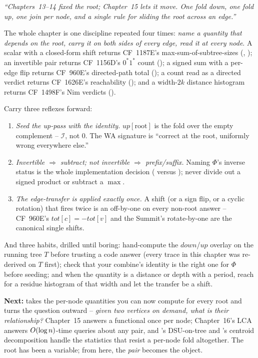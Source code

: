 \begin{lastword}
\emph{``Chapters~13--14 fixed the root; Chapter~15 lets it move. One fold down,
one fold up, one join per node, and a single rule for sliding the root across an
edge.''}

\medskip
The whole chapter is one discipline repeated four times: \emph{name a quantity that
depends on the root, carry it on both sides of every edge, read it at every node}.
A scalar with a closed-form shift returns CF~1187E's max-sum-of-subtree-sizes
(, ); an invertible pair returns
CF~1156D's $0^{\ast}1^{\ast}$ count (); a signed sum with a
per-edge flip returns CF~960E's directed-path total (); a
count read as a directed verdict returns CF~1626E's reachability
(); and a width-$2k$ distance histogram returns CF~1498F's
Nim verdicts ().

\medskip
Carry three reflexes forward:
\begin{enumerate}[nosep, leftmargin=1.6em]
  \item \emph{Seed the up-pass with the identity.} $\mathit{up}[\text{root}]$ is the
        fold over the empty complement -- $\mathcal{I}$, not $0$. The WA signature is
        ``correct at the root, uniformly wrong everywhere else.''
  \item \emph{Invertible $\Rightarrow$ subtract; not invertible $\Rightarrow$ prefix/suffix.}
        Naming $\Phi$'s inverse status is the whole implementation decision
        ( versus ); never
        divide out a signed product or subtract a $\max$.
  \item \emph{The edge-transfer is applied exactly once.} A shift (or a sign flip,
        or a cyclic rotation) that fires twice is an off-by-one on every non-root
        answer -- CF~960E's $\mathit{tot}[c]=-\mathit{tot}[v]$ and the Summit's rotate-by-one
        are the canonical single shifts.
\end{enumerate}

\medskip
And three habits, drilled until boring: hand-compute the $\mathit{down}$/$\mathit{up}$
overlay on the running tree $T$ before trusting a code answer (every trace in this
chapter was re-derived on $T$ first); check that your combine's identity is the right
one for $\Phi$ before seeding; and when the quantity is a distance or depth with a
period, reach for a residue histogram of that width and let the transfer be a shift.

\medskip
\textbf{Next:}  takes the per-node quantities you can now compute for every
root and turns the question outward -- \emph{given two vertices on demand, what is their
relationship?} Chapter~15 answers a functional once per node; Chapter~16's LCA answers
$O(\log n)$-time queries about any pair, and 's DSU-on-tree and
's centroid decomposition handle the statistics that resist a per-node fold
altogether. The root has been a variable; from here, the \emph{pair} becomes the object.
\end{lastword}
